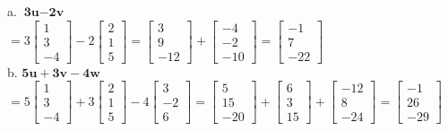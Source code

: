 \documentclass[11pt]{article}
\begin{document}
a. $\textbf{3u} - \textbf{2v}$ \\[5pt]

$
= 3
\begin{bmatrix}
1 \\ 3 \\ -4
\end{bmatrix} 
- 2
\begin{bmatrix}
2 \\ 1 \\ 5
\end{bmatrix}
=
\begin{bmatrix}
3 \\ 9 \\ -12
\end{bmatrix} 
+
\begin{bmatrix}
-4 \\ -2 \\ -10
\end{bmatrix}
=
\begin{bmatrix}
-1 \\ 7 \\ -22
\end{bmatrix} 
$ \\[5pt]

b. $\textbf{5u} + \textbf{3v} - \textbf{4w}$ \\[5pt]

$
= 5
\begin{bmatrix}
1 \\ 3 \\ -4
\end{bmatrix} 
+ 3
\begin{bmatrix}
2 \\ 1 \\ 5
\end{bmatrix}
- 4
\begin{bmatrix}
3 \\ -2 \\ 6
\end{bmatrix}
=
\begin{bmatrix}
5 \\ 15 \\ -20
\end{bmatrix} 
+
\begin{bmatrix}
6 \\ 3 \\ 15
\end{bmatrix}
+
\begin{bmatrix}
-12 \\ 8 \\ -24
\end{bmatrix}
=
\begin{bmatrix}
-1 \\ 26 \\ -29
\end{bmatrix} 
$ \\[5pt]
\end{document}
